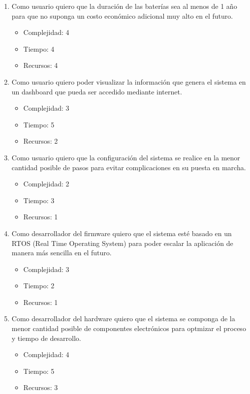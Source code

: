 \documentclass[
11pt, %
]{plan}
\begin{document}
\begin{enumerate}
	\item Como usuario quiero que la duración de las baterías sea al menos de 1 año para que no suponga un costo económico adicional muy alto en el futuro.
	\begin{itemize}
		\item Complejidad: 4
		\item Tiempo: 4
		\item Recursos: 4
	\end{itemize}
		\item Como usuario quiero poder visualizar la información que genera el sistema en un dashboard que pueda ser accedido mediante internet.
	\begin{itemize}
		\item Complejidad: 3
		\item Tiempo: 5
		\item Recursos: 2
	\end{itemize}
	\item Como usuario quiero que la configuración del sistema se realice en la menor cantidad posible de pasos para evitar complicaciones en su puesta en marcha.
	\begin{itemize}
		\item Complejidad: 2
		\item Tiempo: 3
		\item Recursos: 1
	\end{itemize}
	\item Como desarrollador del firmware quiero que el sistema esté basado en un RTOS (Real Time Operating System) para poder escalar la aplicación de manera más sencilla en el futuro.
	\begin{itemize}
		\item Complejidad: 3
		\item Tiempo: 2
		\item Recursos: 1
	\end{itemize}
	\item Como desarrollador del hardware quiero que el sistema se componga de la menor cantidad posible de componentes electrónicos para optmizar el proceso y tiempo de desarrollo.
	\begin{itemize}
		\item Complejidad: 4
		\item Tiempo: 5
		\item Recursos: 3
	\end{itemize}	
\end{enumerate}
\end{document}
